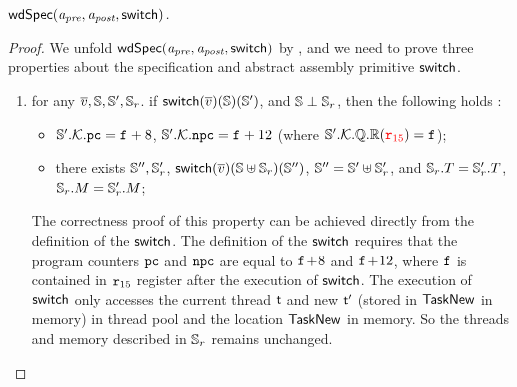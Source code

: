\begin{lemma}
    \em
    \label{lemma:wdspec}
    $\textsf{wdSpec}({\textit{a}_\textit{pre}}, {\textit{a}_\textit{post}}, {\mathsf{switch}})$. 
\end{lemma}
\begin{proof}
    We unfold $\textsf{wdSpec}({\textit{a}_\textit{pre}}, {\textit{a}_\textit{post}}, {\mathsf{switch}})$ by \Def{\ref{def:well-defined specification}}, 
    and we need to prove three properties about the specification and 
    abstract assembly primitive $\mathsf{switch}$. 
    \begin{enumerate}
        \item 
        for any $\overline{v}, \mathbb{S}, \mathbb{S}', \mathbb{S}_r$. 
            if $\mathsf{switch}(\overline{v})(\mathbb{S})(\mathbb{S}')$, and 
            $\mathbb{S} \perp \mathbb{S}_r$, 
            then the following holds : 
            \begin{itemize}
                \item $\mathbb{S}'.\mathcal{K}.\texttt{pc} = \texttt{f}_{} + 8$, 
                    $\mathbb{S}'.\mathcal{K}.\texttt{npc} = \texttt{f}_{} + 12$
                    (where $\mathbb{S}'.\mathcal{K}.\mathbb{Q}.\mathbb{R}
                        ({\color{red} \texttt{r}_{15}}) = \texttt{f}_{}$);
                \item there exists $\mathbb{S}'', \mathbb{S}_r'$, 
                    $\mathsf{switch}(\overline{v})(\mathbb{S} \uplus \mathbb{S}_r) 
                        (\mathbb{S}'')$, $\mathbb{S}'' = \mathbb{S}' \uplus \mathbb{S}_r'$, 
                    and $\mathbb{S}_r.T = \mathbb{S}_r'.T$, 
                    $\mathbb{S}_r.M = \mathbb{S}_r'.M$; 
            \end{itemize}
        \vspace*{0.3em}
        The correctness proof of this property can be achieved directly from the definition 
        of the $\mathsf{switch}$. The definition of the $\mathsf{switch}$ requires that 
        the program counters $\texttt{pc}$ and $\texttt{npc}$ are equal to 
        $\texttt{f}_{}\!+\!8$ and $\texttt{f}_{}\!+\!12$, where $\texttt{f}_{}$ is 
        contained in $\texttt{r}_{15}$ register after the execution of 
        $\mathsf{switch}$. The execution of $\mathsf{switch}$ only accesses 
        the current thread $\textsf{t}$ and new $\textsf{t}'$ (stored in $\mathsf{TaskNew}$ in memory) 
        in thread pool and the location $\mathsf{TaskNew}$ in memory. 
        So the threads and memory described in $\mathbb{S}_r$ 
        remains unchanged.


\end{enumerate}
\end{proof}
